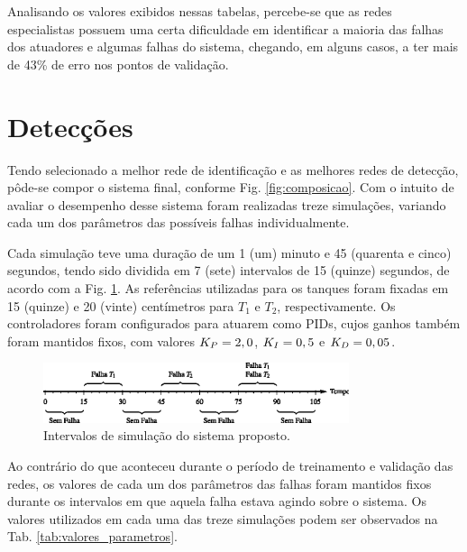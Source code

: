Analisando os valores exibidos nessas tabelas, percebe-se que as redes
especialistas possuem uma certa dificuldade em identificar a maioria das falhas
dos atuadores e algumas falhas do sistema, chegando, em alguns casos, a ter mais
de 43\% de erro nos pontos de validação. %

\section{Detecções}
Tendo selecionado a melhor rede de identificação e as melhores redes de
detecção, pôde-se compor o sistema final, conforme Fig. \ref{fig:composicao}.
Com o intuito de avaliar o desempenho desse sistema foram realizadas treze
simulações, variando cada um dos parâmetros das possíveis falhas
individualmente.

Cada simulação teve uma duração de um 1 (um) minuto e 45 (quarenta e cinco)
segundos, tendo sido dividida em 7 (sete) intervalos de 15 (quinze) segundos, de
acordo com a Fig. \ref{fig:intervalos}. As referências utilizadas para os
tanques foram fixadas em 15 (quinze) e 20 (vinte) centímetros para $T_1$ e
$T_2$, respectivamente. Os controladores foram configurados para atuarem como
PIDs, cujos ganhos também foram mantidos fixos, com valores $K_{\tiny P} = 2,0$,
$K_{\tiny I} = 0,5$ e $K_{\tiny D} = 0,05$.

\begin{figure}[htb]
\centering
    \includegraphics[width=0.8\textwidth]{imgs/resultados/eps/intervalos}
    \caption{Intervalos de simulação do sistema proposto.}
    \label{fig:intervalos}
\end{figure}

Ao contrário do que aconteceu durante o período de treinamento e validação das
redes, os valores de cada um dos parâmetros das falhas foram mantidos fixos
durante os intervalos em que aquela falha estava agindo sobre o sistema. Os
valores utilizados em cada uma das treze simulações podem ser observados na Tab.
\ref{tab:valores_parametros}.

